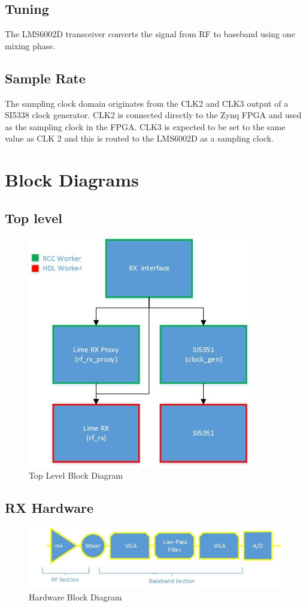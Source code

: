 \documentclass{article}
\begin{document}
\subsection*{Tuning}
The LMS6002D transceiver converts the signal from RF to baseband using one mixing phase.

\subsection*{Sample Rate}
The sampling clock domain originates from  the CLK2 and CLK3 output of a SI5338 clock generator. CLK2 is connected directly to the Zynq FPGA and used as the sampling clock in the FPGA. CLK3 is expected to be set to the same value as CLK 2 and this is routed to the LMS6002D as a sampling clock.

\section*{Block Diagrams}
\subsection*{Top level}
\begin{figure}[ht]
	\centerline{\includegraphics[scale=0.7]{zipper_FE_RX_toplevel}}
	\caption{Top Level Block Diagram}
	\label{fig:top}
\end{figure}
\vspace{25 mm}

\subsection*{RX Hardware}
\begin{figure}[ht]
	\centerline{\includegraphics[scale=0.7]{zipper_FE_RX_HW}}
	\caption{Hardware Block Diagram}
	\label{fig:hw}
\end{figure}
\vspace{25 mm}
\newpage
\end{document}
